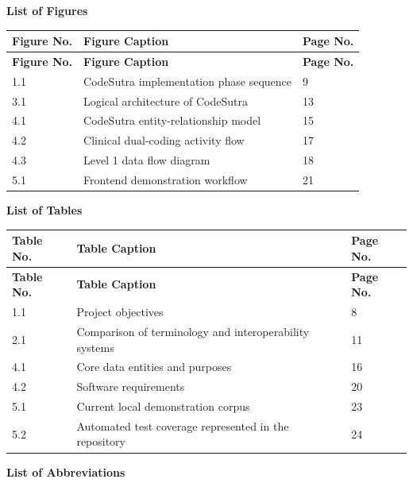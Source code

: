 \documentclass[12pt,a4paper,oneside]{report}
\begin{document}
\begin{center}\textbf{List of Figures}\end{center}
\begin{longtable}{|p{}|p{}|p{}|}
\hline
\textbf{Figure No.} & \textbf{Figure Caption} & \textbf{Page No.} \\ \hline
\endfirsthead
\hline \textbf{Figure No.} & \textbf{Figure Caption} & \textbf{Page No.} \\ \hline\endhead
1.1 & CodeSutra implementation phase sequence & 9 \\ \hline
3.1 & Logical architecture of CodeSutra & 13 \\ \hline
4.1 & CodeSutra entity-relationship model & 15 \\ \hline
4.2 & Clinical dual-coding activity flow & 17 \\ \hline
4.3 & Level 1 data flow diagram & 18 \\ \hline
5.1 & Frontend demonstration workflow & 21 \\ \hline
\end{longtable}
\vspace{4pt}
\begin{center}\textbf{List of Tables}\end{center}
\begin{longtable}{|p{}|p{}|p{}|}
\hline
\textbf{Table No.} & \textbf{Table Caption} & \textbf{Page No.} \\ \hline
\endfirsthead
\hline \textbf{Table No.} & \textbf{Table Caption} & \textbf{Page No.} \\ \hline\endhead
1.1 & Project objectives & 8 \\ \hline
2.1 & Comparison of terminology and interoperability systems & 11 \\ \hline
4.1 & Core data entities and purposes & 16 \\ \hline
4.2 & Software requirements & 20 \\ \hline
5.1 & Current local demonstration corpus & 23 \\ \hline
5.2 & Automated test coverage represented in the repository & 24 \\ \hline
\end{longtable}
\vspace{4pt}
\begin{center}\textbf{List of Abbreviations}\end{center}
\end{document}
